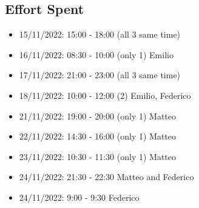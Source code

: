 \subsection{Effort Spent}
\begin{itemize}
    \item 15/11/2022: 15:00 - 18:00 (all 3 same time)
    \item 16/11/2022: 08:30 - 10:00 (only 1) Emilio
    \item 17/11/2022: 21:00 - 23:00 (all 3 same time)
    \item 18/11/2022: 10:00 - 12:00 (2) Emilio, Federico
    \item 21/11/2022: 19:00 - 20:00 (only 1) Matteo
    \item 22/11/2022: 14:30 - 16:00 (only 1) Matteo
    \item 23/11/2022: 10:30 - 11:30 (only 1) Matteo
    \item 24/11/2022: 21:30 - 22:30  Matteo and Federico
    \item 24/11/2022: 9:00 - 9:30  Federico
\end{itemize}